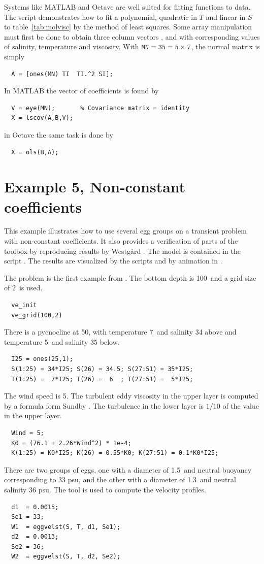 Systems like MATLAB and Octave are well suited for fitting functions
to data. The script  demonstrates how to fit a
polynomial, quadratic in $T$ and linear in $S$ to
table~\ref{tab:molvisc} by the method of least squares.  Some array manipulation must first be done to obtain
three column vectors ,  and  with corresponding
values of salinity, temperature and viscosity. With ${\mbox{\texttt{MN}}} = 35 = 5
\times 7$, the normal matrix is simply
\begin{verbatim}
  A = [ones(MN) TI  TI.^2 SI];  
\end{verbatim}
In MATLAB the vector  of coefficients is found by
\begin{verbatim}
  V = eye(MN);       % Covariance matrix = identity 
  X = lscov(A,B,V);  
\end{verbatim}
in Octave the same task is done by
\begin{verbatim}
  X = ols(B,A);
\end{verbatim}


\section{Example 5, Non-constant coefficients}

This example illustrates how to use several egg groups on a transient
problem with non-constant coefficients. It also provides a verification of
parts of the toolbox by reproducing results by Westg{\aa}rd .
The model is contained in the script . The results are
visualized by the scripts  and by animation in
.

The problem is the first example from \cite{west89}. The bottom depth
is 100\m\ and a grid size of 2\m\ is used.
\begin{verbatim}
  ve_init
  ve_grid(100,2)
\end{verbatim}
There is a pycnocline at 50\m, with temperature 7\degC\ and salinity 34
above and temperature 5\degC\ and salinity 35 below.
\begin{verbatim}
  I25 = ones(25,1);        
  S(1:25) = 34*I25; S(26) = 34.5; S(27:51) = 35*I25;
  T(1:25) =  7*I25; T(26) =  6  ; T(27:51) =  5*I25;
\end{verbatim}
The wind speed is 5\mps. The turbulent eddy viscosity in the upper
layer is computed by a formula form Sundby . The
turbulence in the lower layer is $1/10$ of the value in the upper
layer.
\begin{verbatim}
  Wind = 5;
  K0 = (76.1 + 2.26*Wind^2) * 1e-4;
  K(1:25) = K0*I25; K(26) = 0.55*K0; K(27:51) = 0.1*K0*I25;
\end{verbatim}
There are two groups of eggs, one with a diameter of 1.5\mm\ and
neutral buoyancy corresponding to 33 psu, and the other with a
diameter of 1.3\mm\ and neutral salinity 36 psu. The tool
 is used to compute the velocity profiles.
\begin{verbatim}
  d1  = 0.0015;
  Se1 = 33;
  W1  = eggvelst(S, T, d1, Se1); 
  d2  = 0.0013;
  Se2 = 36;
  W2  = eggvelst(S, T, d2, Se2); 
\end{verbatim}

